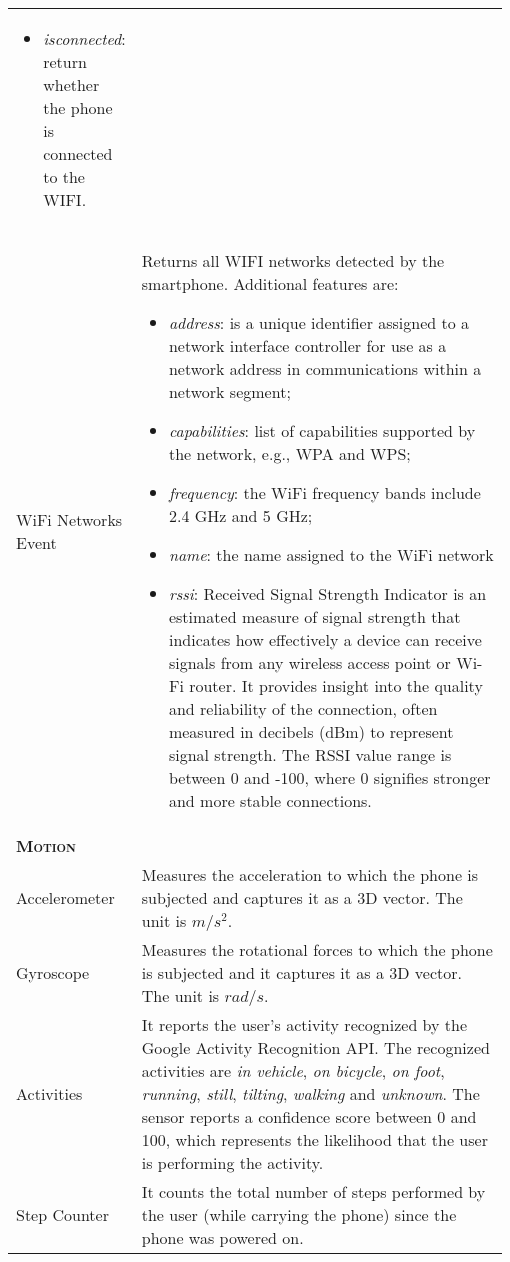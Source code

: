 \begin{center}
\begin{longtable}{p{0.15\linewidth}|p{0.83\linewidth}}
\begin{itemize}
        \item \textit{isconnected}: return whether the phone is connected to the WIFI.
    \end{itemize}\\
    WiFi Networks Event &
    Returns all WIFI networks detected by the smartphone. Additional features are:
    \begin{itemize}
        \item \textit{address}: is a unique identifier assigned to a network interface controller for use as a network address in communications within a network segment;
        \item \textit{capabilities}: list of capabilities supported by the network, e.g., WPA and WPS;
        \item \textit{frequency}: the WiFi frequency bands include 2.4 GHz and 5 GHz;
        \item \textit{name}: the name assigned to the WiFi network
        \item \textit{rssi}: Received Signal Strength Indicator is an estimated measure of signal strength that indicates how effectively a device can receive signals from any wireless access point or Wi-Fi router. It provides insight into the quality and reliability of the connection, often measured in decibels (dBm) to represent signal strength.
        The RSSI value range is between 0 and -100, where 0 signifies stronger and more stable connections.
    \end{itemize}\\
    \multicolumn{2}{l}{\textbf{\textsc{Motion}}} \\
    Accelerometer & 
    Measures the acceleration to which the phone is subjected and captures it as a 3D vector. The unit is $m/s^2$. \\
    Gyroscope &
    Measures the rotational forces to which the phone is subjected and it captures it as a 3D vector. The unit is $rad/s$. \\
    Activities &
    It reports the user's activity recognized by the Google Activity Recognition API. The recognized activities are \textit{in vehicle}, \textit{on bicycle}, \textit{on foot}, \textit{running}, \textit{still}, \textit{tilting}, \textit{walking} and \textit{unknown}. The sensor reports a confidence score between 0 and 100, which represents the likelihood that the user is performing the activity. \\
    Step Counter &
    It counts the total number of steps performed by the user (while carrying the phone) since the phone was powered on.\\

\end{longtable}
\end{center}
